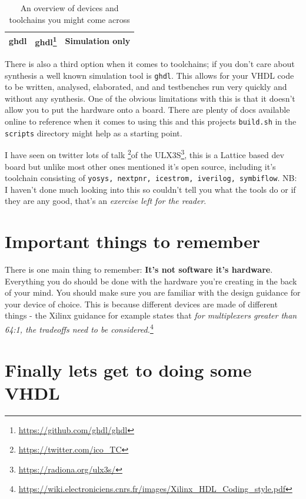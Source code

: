 \documentclass[11pt,a4paper]{article}
\begin{document}
\begin{table}
\begin{center}
\begin{tabular}{| m{4cm} | m{4cm} | m{4cm} |}
            ghdl & ghdl\footnote{\url{https://github.com/ghdl/ghdl}} & Simulation only \\ \hline
        \end{tabular}
        \caption{An overview of devices and toolchains you might come across}
        \label{table:devices}
    \end{center}
\end{table}

There is also a third option when it comes to toolchains; if you don't care about synthesis a well known simulation tool is \texttt{ghdl}. This allows for your VHDL code to be written, analysed, elaborated, and and testbenches run very quickly and without any synthesis. One of the obvious limitations with this is that it doesn't allow you to put the hardware onto a board. There are plenty of docs available online to reference when it comes to using this and this projects \texttt{build.sh} in the \texttt{scripts} directory might help as a starting point.  

I have seen on twitter lots of talk \footnote{\url{https://twitter.com/ico_TC}}of the ULX3S\footnote{\url{https://radiona.org/ulx3s/}}, this is a Lattice based dev board but unlike most other ones mentioned it's open source, including it's toolchain consisting of \texttt{yosys, nextpnr, icestrom, iverilog, symbiflow}. NB: I haven't done much looking into this so couldn't tell you what the tools do or if they are any good, that's an \emph{exercise left for the reader}.

\section{Important things to remember}
There is one main thing to remember: \textbf{It's not software it's hardware}. Everything you do should be done with the hardware you're creating in the back of your mind. You should make sure you are familiar with the design guidance for your device of choice. This is because different devices are made of different things - the Xilinx guidance for example states that \emph{for multiplexers greater than 64:1, the tradeoffs need to be considered.}\footnote{\url{https://wiki.electroniciens.cnrs.fr/images/Xilinx_HDL_Coding_style.pdf}}

\section{Finally lets get to doing some VHDL}
\end{document}
